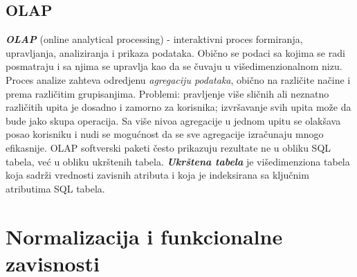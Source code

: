 \documentclass{article}
\begin{document}
\subsection{OLAP}
\textit{\textbf{OLAP}} (online analytical processing) - interaktivni
proces formiranja, upravljanja, analiziranja i prikaza podataka.
Obično se podaci sa kojima se radi posmatraju i sa njima se
upravlja kao da se čuvaju u višedimenzionalnom nizu.
\newline
Proces analize zahteva odredjenu \textit{agregaciju podataka},
obično na različite načine i prema različitim grupisanjima.
Problemi: pravljenje više sličnih ali neznatno različitih upita je
dosadno i zamorno za korisnika; izvršavanje svih upita može da bude
jako skupa operacija. Sa više nivoa agregacije u jednom upitu se
olakšava posao korisniku i nudi se mogućnost da se sve agregacije
izračunaju mnogo efikasnije.
\newline
OLAP softverski paketi često prikazuju rezultate ne u obliku SQL
tabela, već u obliku ukrštenih tabela. \textit{\textbf{Ukrštena
tabela}} je višedimenziona tabela koja sadrži vrednosti zavisnih
atributa i koja je indeksirana sa ključnim atributima SQL tabela.

\newpage

\section{Normalizacija i funkcionalne zavisnosti}
\end{document}
